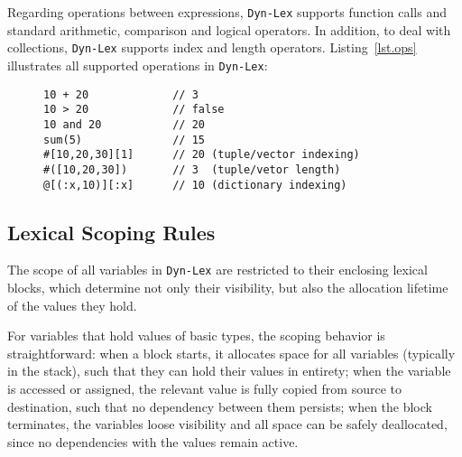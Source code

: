 \documentclass[12pt]{article}
\newcommand{\lex} {\texttt{Dyn-Lex}\xspace}
\begin{document}
Regarding operations between expressions, \lex supports function calls and
standard arithmetic, comparison and logical operators.
In addition, to deal with collections, \lex supports index and length
operators.
Listing~\ref{lst.ops} illustrates all supported operations in \lex:

\begin{figure}
\begin{lstlisting}[caption=Supported operations in \lex., label=lst.ops]
10 + 20             // 3
10 > 20             // false
10 and 20           // 20
sum(5)              // 15
#[10,20,30][1]      // 20 (tuple/vector indexing)
#([10,20,30])       // 3  (tuple/vetor length)
@[(:x,10)][:x]      // 10 (dictionary indexing)
\end{lstlisting}
\end{figure}

\subsection{Lexical Scoping Rules}

The scope of all variables in \lex are restricted to their enclosing lexical
blocks, which determine not only their visibility, but also the allocation
lifetime of the values they hold.

For variables that hold values of basic types, the scoping behavior is
straightforward:
    when a block starts, it allocates space for all variables (typically in the
        stack), such that they can hold their values in entirety;
    when the variable is accessed or assigned, the relevant value is fully
        copied from source to destination, such that no dependency between them
        persists;
    when the block terminates, the variables loose visibility and all space can
        be safely deallocated, since no dependencies with the values remain
        active.
\end{document}
